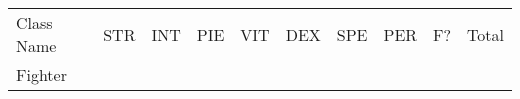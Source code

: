 \documentclass[12pt]{article}
\begin{document}
\begin{longtable}[]{@{}llllllllll@{}}
\toprule
\begin{minipage}[t]{0.13\columnwidth}\raggedright\strut
Class Name
\strut\end{minipage} &
\begin{minipage}[t]{0.06\columnwidth}\raggedright\strut
STR
\strut\end{minipage} &
\begin{minipage}[t]{0.06\columnwidth}\raggedright\strut
INT
\strut\end{minipage} &
\begin{minipage}[t]{0.06\columnwidth}\raggedright\strut
PIE
\strut\end{minipage} &
\begin{minipage}[t]{0.06\columnwidth}\raggedright\strut
VIT
\strut\end{minipage} &
\begin{minipage}[t]{0.06\columnwidth}\raggedright\strut
DEX
\strut\end{minipage} &
\begin{minipage}[t]{0.06\columnwidth}\raggedright\strut
SPE
\strut\end{minipage} &
\begin{minipage}[t]{0.06\columnwidth}\raggedright\strut
PER
\strut\end{minipage} &
\begin{minipage}[t]{0.07\columnwidth}\raggedright\strut
F?
\strut\end{minipage} &
\begin{minipage}[t]{0.08\columnwidth}\raggedright\strut
Total
\strut\end{minipage}\tabularnewline
\begin{minipage}[t]{0.13\columnwidth}\raggedright\strut
Fighter
\strut\end{minipage} &
\begin{minipage}[t]{0.06\columnwidth}\raggedright\strut
\strut\end{minipage} &
\begin{minipage}[t]{0.06\columnwidth}\raggedright\strut
\strut\end{minipage} &
\begin{minipage}[t]{0.06\columnwidth}\raggedright\strut
\strut\end{minipage} &
\begin{minipage}[t]{0.06\columnwidth}\raggedright\strut
\strut\end{minipage} &
\begin{minipage}[t]{0.06\columnwidth}\raggedright\strut

\end{minipage}
\end{longtable}
\end{document}
